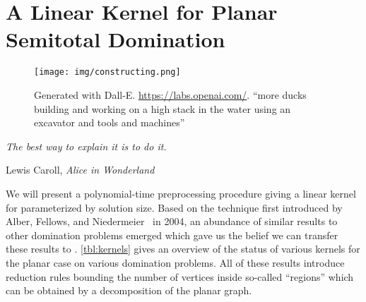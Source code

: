 \chapter{A Linear Kernel for Planar Semitotal Domination}\label{ch:linkern}

\vspace*{-50pt}
\begin{figure}[ht]
\texttt{[image: img/constructing.png]}
        \captionsetup{textformat=empty,labelformat=blank}
        \caption[Generated with Dalle-E. Knowledge Cutoff 09-2022]{Generated with Dall-E. \url{https://labs.openai.com/}. ``more ducks building and working on  a high stack in the water using an excavator and tools and machines''}
\end{figure}

\epigraph{\itshape The best way to explain it is to do it.}{Lewis Caroll, \textit{Alice in Wonderland}}

We will present a polynomial-time preprocessing procedure giving a linear kernel for \psdom parameterized by solution size. Based on the technique first introduced by Alber, Fellows, and Niedermeier~\cite{Alber2004} in 2004, an abundance of similar results to other domination problems emerged which gave us the belief we can transfer these results to \sdom. 
\cref{tbl:kernels} gives an overview of the status of various kernels for the planar case on various domination problems.
All of these results introduce reduction rules bounding the number of vertices inside so-called ``regions'' which can be obtained by a decomposition of the planar graph. 

